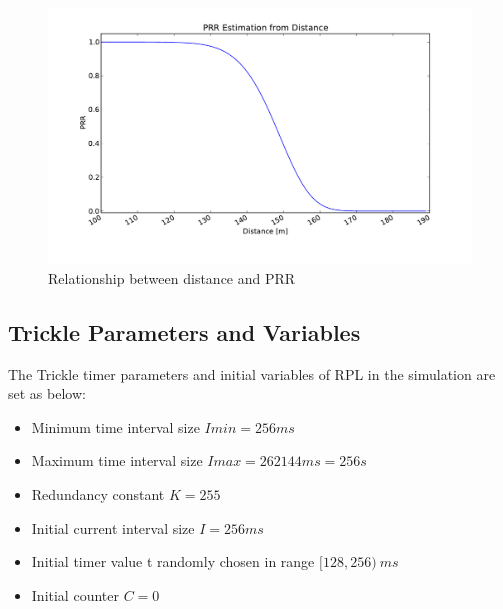 \begin{figure}[htbp]
  \begin{center}
    \leavevmode
      \includegraphics[scale=0.45]{Pics/prr.pdf}
   \caption{Relationship between distance and PRR}
    \label{fig:prr}
  \end{center}
\end{figure}

\subsection{Trickle Parameters and Variables}
\label{trickle parameters}
The Trickle timer parameters and initial variables of RPL in the simulation are set as below:
\begin{itemize}
\item Minimum time interval size $Imin = 256 ms$

\item Maximum time interval size $Imax = 262144 ms = 256 s$

\item Redundancy constant $K = 255$

\item Initial current interval size $I = 256 ms$

\item Initial timer value t randomly chosen in range $[128, 256)\:ms$

\item Initial counter $C = 0$
\end{itemize}

